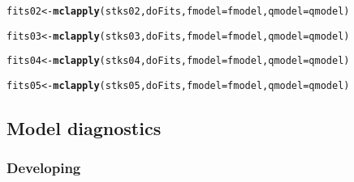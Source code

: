 \documentclass[a4paper]{article}\usepackage{graphicx, color}
\makeatletter
\newcommand{\hlfunctioncall}[1]{\textcolor[rgb]{0.501960784313725,0,0.329411764705882}{\textbf{#1}}}%
\newenvironment{kframe}{%
 \def\at@end@of@kframe{}%
 \ifinner\ifhmode%
  \def\at@end@of@kframe{\end{minipage}}%
  \begin{minipage}{\columnwidth}%
 \fi\fi%
 \def\FrameCommand##1{\hskip\@totalleftmargin \hskip-\fboxsep
 \colorbox{shadecolor}{##1}\hskip-\fboxsep
     \hskip-\linewidth \hskip-\@totalleftmargin \hskip\columnwidth}%
 \MakeFramed {\advance\hsize-\width
   \@totalleftmargin\z@ \linewidth\hsize
   \@setminipage}}%
 {\par\unskip\endMakeFramed%
 \at@end@of@kframe}
\newenvironment{knitrout}{}{} %
\makeatother
\begin{document}
\begin{knitrout}
\color{fgcolor}\begin{kframe}
\begin{alltt}
fits02 <- \hlfunctioncall{mclapply}(stks02, doFits, fmodel = fmodel, qmodel = qmodel)
\end{alltt}
\end{kframe}
\end{knitrout}

\begin{knitrout}
\color{fgcolor}\begin{kframe}
\begin{alltt}
fits03 <- \hlfunctioncall{mclapply}(stks03, doFits, fmodel = fmodel, qmodel = qmodel)
\end{alltt}
\end{kframe}
\end{knitrout}

\begin{knitrout}
\color{fgcolor}\begin{kframe}
\begin{alltt}
fits04 <- \hlfunctioncall{mclapply}(stks04, doFits, fmodel = fmodel, qmodel = qmodel)
\end{alltt}
\end{kframe}
\end{knitrout}

\begin{knitrout}
\color{fgcolor}\begin{kframe}
\begin{alltt}
fits05 <- \hlfunctioncall{mclapply}(stks05, doFits, fmodel = fmodel, qmodel = qmodel)
\end{alltt}
\end{kframe}
\end{knitrout}


\subsection*{Model diagnostics}
\subsubsection*{Developing}
\end{document}
